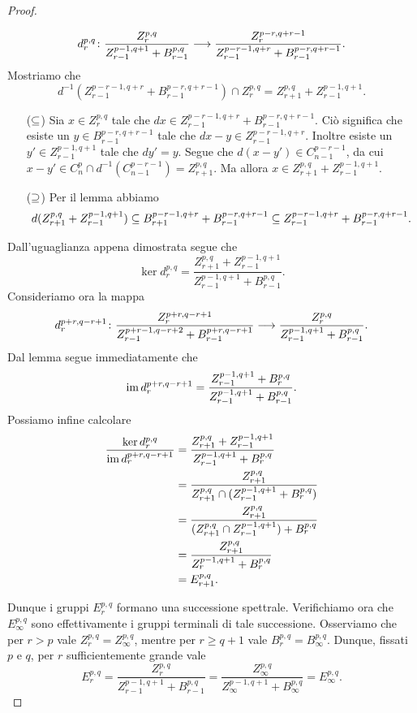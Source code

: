 \begin{proof}
\begin{enumerate}
\[
\map{d^{p,q}_r}{\frac{Z^{p,q}_r}{Z^{p-1,q+1}_{r-1}+B^{p,q}_{r-1}}}{\frac{Z^{p-r,q+r-1}_r}{Z^{p-r-1,q+r}_{r-1}+B^{p-r,q+r-1}_{r-1}}}.
\]
Mostriamo che 
\[
d^{-1}(Z^{p-r-1,q+r}_{r-1}+B^{p-r,q+r-1}_{r-1})\cap Z^{p,q}_r=Z^{p,q}_{r+1}+Z^{p-1,q+1}_{r-1}.
\]
\begin{itemize}
\item[(\(\subseteq\))] Sia \(x\in Z^{p,q}_r\) tale che \(dx\in Z^{p-r-1,q+r}_{r-1}+B^{p-r,q+r-1}_{r-1}\). Ciò significa che esiste un \(y\in B^{p-r,q+r-1}_{r-1}\) tale che \(dx-y\in Z^{p-r-1,q+r}_{r-1}\). Inoltre esiste un \(y'\in Z^{p-1,q+1}_{r-1}\) tale che \(dy'=y\). Segue che \(d(x-y')\in C^{p-r-1}_{n-1}\), da cui \(x-y'\in C^p_n\cap d^{-1}(C^{p-r-1}_{n-1})=Z^{p,q}_{r+1}\). Ma allora \(x\in Z^{p,q}_{r+1}+Z^{p-1,q+1}_{r-1}\).
\item[(\(\supseteq\))] Per il lemma abbiamo
\[
d(Z^{p,q}_{r+1}+Z^{p-1,q+1}_{r-1})\subseteq B^{p-r-1,q+r}_{r+1}+B^{p-r,q+r-1}_{r-1}\subseteq Z^{p-r-1,q+r}_{r-1}+B^{p-r,q+r-1}_{r-1}.
\]
\end{itemize}
Dall'uguaglianza appena dimostrata segue che
\[
\ker d^{p,q}_r=\frac{Z^{p,q}_{r+1}+Z^{p-1,q+1}_{r-1}}{Z^{p-1,q+1}_{r-1}+B^{p,q}_{r-1}}.
\]
Consideriamo ora la mappa
\[
\map{d^{p+r,q-r+1}_r}{\frac{Z^{p+r,q-r+1}_r}{Z^{p+r-1,q-r+2}_{r-1}+B^{p+r,q-r+1}_{r-1}}}{\frac{Z^{p,q}_r}{Z^{p-1,q+1}_{r-1}+B^{p,q}_{r-1}}}.
\]
Dal lemma segue immediatamente che
\[
\operatorname{im} d^{p+r,q-r+1}_r=\frac{Z^{p-1,q+1}_{r-1}+B^{p,q}_r}{Z^{p-1,q+1}_{r-1}+B^{p,q}_{r-1}}.
\]
Possiamo infine calcolare
\begin{align*}
\frac{\ker d^{p,q}_r}{\operatorname{im} d^{p+r,q-r+1}_r}&=\frac{Z^{p,q}_{r+1}+Z^{p-1,q+1}_{r-1}}{Z^{p-1,q+1}_{r-1}+B^{p,q}_r}\\
&=\frac{Z^{p,q}_{r+1}}{Z^{p,q}_{r+1}\cap(Z^{p-1,q+1}_{r-1}+B^{p,q}_r)}\\
&=\frac{Z^{p,q}_{r+1}}{(Z^{p,q}_{r+1}\cap Z^{p-1,q+1}_{r-1})+B^{p,q}_r}\\
&=\frac{Z^{p,q}_{r+1}}{Z^{p-1,q+1}_r+B^{p,q}_r}\\
&=E^{p,q}_{r+1}.
\end{align*}
\end{enumerate}
Dunque i gruppi \(E^{p,q}_r\) formano una successione spettrale. Verifichiamo ora che \(E^{p,q}_\infty\) sono effettivamente i gruppi terminali di tale successione. Osserviamo che per \(r>p\) vale \(Z^{p,q}_r=Z^{p,q}_\infty\), mentre per \(r\ge q+1\) vale \(B^{p,q}_r=B^{p,q}_\infty\). Dunque, fissati \(p\) e \(q\), per \(r\) sufficientemente grande vale
\[
E^{p,q}_r=\frac{Z^{p,q}_r}{Z^{p-1,q+1}_{r-1}+B^{p,q}_{r-1}}=\frac{Z^{p,q}_\infty}{Z^{p-1,q+1}_{\infty}+B^{p,q}_\infty}=E^{p,q}_\infty.
\]
\end{proof}
